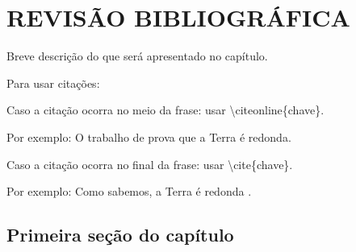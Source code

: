 \chapter{REVISÃO BIBLIOGRÁFICA}
\label{cap1Revisao}
Breve descrição do que será apresentado no capítulo.  

Para usar citações:

Caso a citação ocorra no meio da frase: usar \textbackslash citeonline\{chave\}.

Por exemplo: O trabalho de  prova que a Terra é redonda. 

Caso a citação ocorra no final da frase: usar \textbackslash cite\{chave\}.

Por exemplo: Como sabemos, a Terra é redonda \cite{chave}.

\section{Primeira seção do capítulo}

